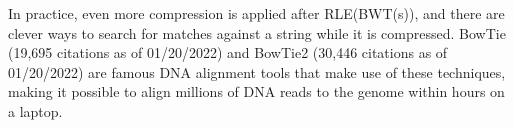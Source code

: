 In practice, even more compression is applied after RLE(BWT(s)), and there are clever ways to search for matches against a string while it is compressed. BowTie (19,695 citations as of 01/20/2022) and BowTie2 (30,446 citations as of 01/20/2022) are famous DNA alignment tools that make use of these techniques, making it possible to align millions of DNA reads to the genome within hours on a laptop.
